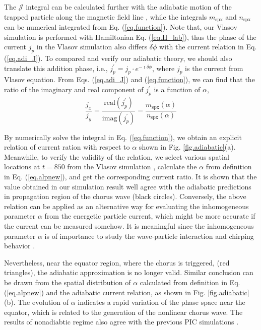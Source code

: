 The $\mathcal{J}$ integral can be calculated further with the adiabatic motion of the trapped particle along the magnetic field line \cite{summers2012}, while the integrals $m_\mathrm{spx}$ and $n_\mathrm{spx}$ can be numerical integrated from Eq. (\ref{eq.function}).
Note that, our Vlasov simulation is performed with Hamiltonian Eq. (\ref{eq.H_lab}), thus the phase of the current $j_p$ in the Vlasov simulation also differs $\delta \phi$ with the current relation in Eq. (\ref{eq.adi_J}).
To compared and verify our adiabatic theory, we should also translate this addition phase, i.e., $j^\prime_{p} = j_p \cdot e^{-\imath \delta \phi}$, where $j_p$ is the current from Vlasov equation. 
From Eqs. (\ref{eq.adi_J}) and (\ref{eq.function}), we can find that the ratio of the imaginary and real component of $j^\prime_{p}$ is a function of $\alpha$, 
\begin{equation}\label{eq.adia_relation}
\frac{j_x}{j_y} = \frac{\mathrm{real}(j^\prime_p)}{\mathrm{imag}(j^\prime_p)} = \frac{m_\mathrm{spx}(\alpha)}{n_\mathrm{spx}(\alpha)}
\end{equation}

By numerically solve the integral in Eq. (\ref{eq.function}), we obtain an explicit relation of current ration with respect to $\alpha$ shown in Fig. \ref{fig.adiabatic}(a). 
Meanwhile, to verify the validity of the relation, we select various spatial locations at $t=850$ from the Vlasov simulation \cite{zheng2023b,zheng2024}, calculate the $\alpha$ from definition in Eq. (\ref{eq.alpnew}), and get the corresponding current ratio.
It is shown that the value obtained in our simulation result well agree with the adiabatic predictions in propagation region of the chorus wave (black circles).
Conversely, the above relation can be applied as an alternative way for evaluating the inhomogeneous parameter $\alpha$ from the energetic particle current, which might be more accurate if the current can be measured somehow.
It is meaningful since the inhomogeneous parameter $\alpha$ is of importance to study the wave-particle interaction and chirping behavior \cite{tao_theoretical_2020,omura2008}.

Nevertheless, near the equator region, where the chorus is triggered, (red triangles), the adiabatic approximation is no longer valid.
Similar conclusion can be drawn from the spatial distribution of $\alpha$ calculated from definition in Eq. (\ref{eq.alpnew}) and the adiabatic current relation, as shown in Fig. \ref{fig.adiabatic}(b). 
The evolution of $\alpha$ indicates a rapid variation of the phase space near the equator, which is related to the generation of the nonlinear chorus wave.
The results of nonadiabtic regime also agree with the previous PIC simulations \cite{tao2017a,tao2017b}.
